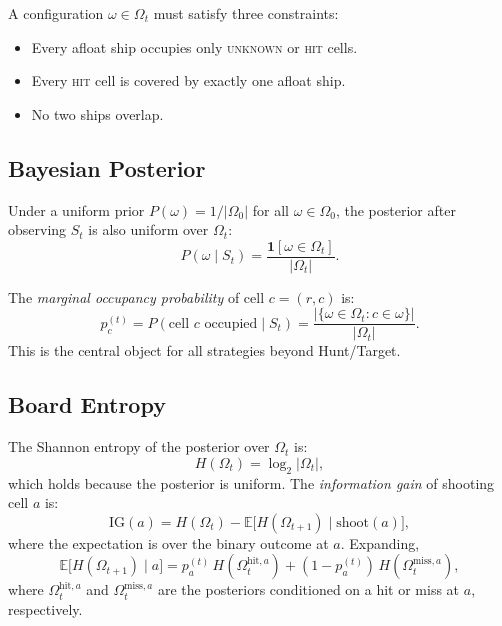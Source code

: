 \documentclass[12pt,a4paper]{article}
\newcommand{\E}{\mathbb{E}}
\newcommand{\1}{\mathbf{1}}
\begin{document}
A configuration $\omega \in \Omega_t$ must satisfy three constraints:
\begin{itemize}[nosep]
  \item Every afloat ship occupies only \textsc{unknown} or \textsc{hit} cells.
  \item Every \textsc{hit} cell is covered by exactly one afloat ship.
  \item No two ships overlap.
\end{itemize}

\subsection{Bayesian Posterior}

Under a uniform prior $P(\omega) = 1/|\Omega_0|$ for all $\omega \in \Omega_0$,
the posterior after observing $S_t$ is also uniform over $\Omega_t$:
\begin{equation}
  P(\omega \mid S_t) =
    \frac{\1[\omega \in \Omega_t]}{|\Omega_t|}.
  \label{eq:posterior}
\end{equation}

The \emph{marginal occupancy probability} of cell $c = (r,c)$ is:
\begin{equation}
  p_c^{(t)} = P(\text{cell } c \text{ occupied} \mid S_t)
    = \frac{|\{\omega \in \Omega_t : c \in \omega\}|}{|\Omega_t|}.
  \label{eq:marginal}
\end{equation}
This is the central object for all strategies beyond Hunt/Target.

\subsection{Board Entropy}

The Shannon entropy of the posterior over $\Omega_t$ is:
\begin{equation}
  H(\Omega_t) = \log_2 |\Omega_t|,
  \label{eq:true_entropy}
\end{equation}
which holds because the posterior is uniform.  The \emph{information gain} of
shooting cell $a$ is:
\begin{equation}
  \mathrm{IG}(a) = H(\Omega_t) - \E\bigl[H(\Omega_{t+1}) \mid \text{shoot}(a)\bigr],
  \label{eq:ig}
\end{equation}
where the expectation is over the binary outcome at $a$.  Expanding,
\begin{equation}
  \E\bigl[H(\Omega_{t+1}) \mid a\bigr]
    = p_a^{(t)}\, H(\Omega_t^{\text{hit},a})
    + (1 - p_a^{(t)})\, H(\Omega_t^{\text{miss},a}),
\end{equation}
where $\Omega_t^{\text{hit},a}$ and $\Omega_t^{\text{miss},a}$ are the posteriors
conditioned on a hit or miss at $a$, respectively.
\end{document}
